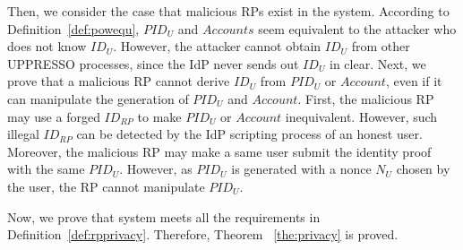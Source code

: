 Then, we consider the case that malicious RPs exist in the system. %
According to Definition~\ref{def:powequ}, $PID_U$ and $Accounts$ seem equivalent to the attacker who does not know $ID_U$. However, the attacker cannot obtain $ID_U$ from other UPPRESSO processes, since the IdP never sends out $ID_U$ in clear. Next, we prove that a malicious RP cannot derive $ID_U$ from $PID_U$ or $Account$, even if it can manipulate the generation of $PID_U$ and $Account$. First, the malicious RP may use a forged $ID_{RP}$ to make $PID_U$ or $Account$ inequivalent. However, such illegal $ID_{RP}$ can be detected by the IdP scripting process of an honest user. Moreover, the malicious RP may make a same user submit the identity proof with the same $PID_U$. However, as $PID_U$ is generated with a nonce $N_U$ chosen by the user, the RP cannot manipulate $PID_U$.
\begin{comment}
\vspace{-\topsep}
\begin{itemize}
\setlength{\itemsep}{0pt plus 1pt}
\item RP may lead the login using the forged  so that $PID_U$s and $Accounts$ are no more equivalent. However, $ID_{RP}$ are provided by the $Cert$ which is verified at algorithm~\ref{alg3} line 17, by the IdP's public key set initially and not modified.  $PID_{RP}$ is generated by the $ID_{RP}$ at line 21 using the honest user generated nonce at line 20. Therefore, it is impossible to lead the honest user to use the illegal $ID_{RP}$ and $PID_{RP}$.
\item RP may also lead the same user to upload the identity proof with same $PID_U$ or $Account$ so that the system is not RP-Privacy according to requirement~\ref{req:rp}. However, the $PID_U$ is generated containing the user's generated nonce $N_U$ so that it is not controlled by the RP. $Account$ is generated as the form $ID_{RP}^{ID_U} \mod p$, while RPs may lead the user to use the same $ID_{RP}$ to generate identity proof. However, the $ID_{RP}$ is bound with $Cert$ which is verified by the user and it is easy for user to find out the login RP  does not coincide the RP name shown on her browser.
\end{itemize}
\end{comment}
Now, we prove that system meets all the requirements in Definition~\ref{def:rpprivacy}. Therefore, Theorem ~\ref{the:privacy} is proved.





